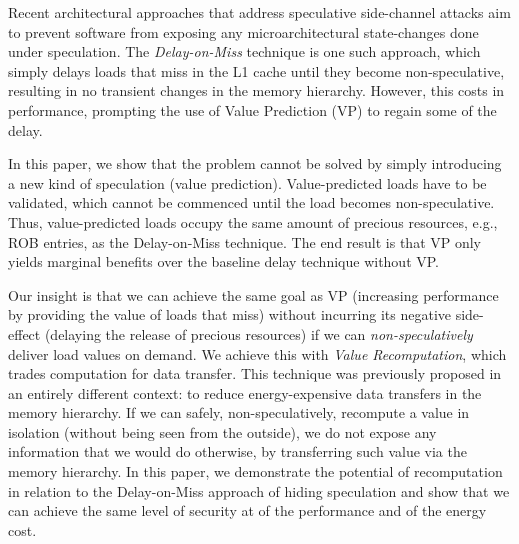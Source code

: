 Recent architectural approaches that address speculative side-channel attacks aim to prevent software from exposing any microarchitectural state-changes done under speculation. 
The \emph{Delay-on-Miss} technique is one such approach, which
simply delays loads that miss in the L1 cache until they become non-speculative, resulting in no transient changes in the memory hierarchy.
However, this costs in performance, prompting the use of Value Prediction (VP) to regain some of the delay.

In this paper, we show that the problem cannot be solved by simply introducing a new kind of speculation (value prediction). %
Value-predicted loads have to be validated, which cannot be commenced until the load becomes non-speculative. %
Thus, value-predicted loads occupy the same amount of precious resources, e.g., ROB entries, as the Delay-on-Miss technique. %
The end result is that VP only yields marginal benefits over the baseline delay technique without VP. %

Our insight is that we can achieve the same goal as VP (increasing performance by providing the value of loads that miss) without incurring its negative side-effect (delaying the release of precious resources) if we can \emph{non-speculatively} deliver load values on demand.
We achieve this with \emph{Value Recomputation}, which trades computation for data transfer. 
This technique was previously proposed in an entirely different context: to reduce energy-expensive data transfers in the memory hierarchy. 
If we can safely, non-speculatively, recompute a value in isolation (without being seen from the outside), we do not expose any information that we would do otherwise, by transferring such value via the memory hierarchy.
In this paper, we demonstrate the potential of recomputation in relation to the Delay-on-Miss approach of hiding speculation and show that we can achieve the same level of security at  of the performance and  of the energy cost.




